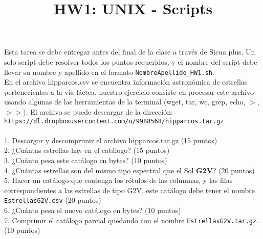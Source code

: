 \documentclass[12pt]{article}
\title{\begin{LARGE}
{HW1: UNIX - Scripts}
\end{LARGE}}
\begin{document}
\maketitle

Esta tarea se debe entregar antes del final de la clase a través de Sicua plus. Un solo script debe resolver todos los puntos requeridos, y el nombre del script debe llevar su nombre y apellido en el formato \verb"NombreApellido_HW1.sh". \\

En el archivo hipparcos.csv se encuentra información astronómica de estrellas pertenecientes a 
la vía láctea, nuestro ejercicio consiste en procesar este archivo usando algunas de las herramientas de la terminal (wget, tar, wc, grep, echo, $>$, $>>$). El archivo se puede descargar de la dirección: \verb"https://dl.dropboxusercontent.com/u/9988568/hipparcos.tar.gz"\\ 
\\
1. Descargar y descomprimir el archivo hipparcos.tar.gz (15 puntos) \\
2. ¿Cuántas estrellas hay en el catálogo? (15 puntos) \\
3. ¿Cuánto pesa este catálogo en bytes? (10 puntos) \\
4. ¿Cuántas estrellas son del mismo tipo espectral que el Sol \textbf{G2V}? (20 puntos) \\
5. Hacer un catálogo que contenga los rótulos de las columnas, y las filas correspondientes a las estrellas de tipo G2V, este catálogo debe tener el nombre \verb"EstrellasG2V.csv" (20 puntos)\\
6. ¿Cuánto pesa el nuevo catálogo en bytes? (10 puntos)\\
7. Comprimir el catálogo parcial quedando con el nombre \verb"EstrellasG2V.tar.gz". (10 puntos)
\end{document}
